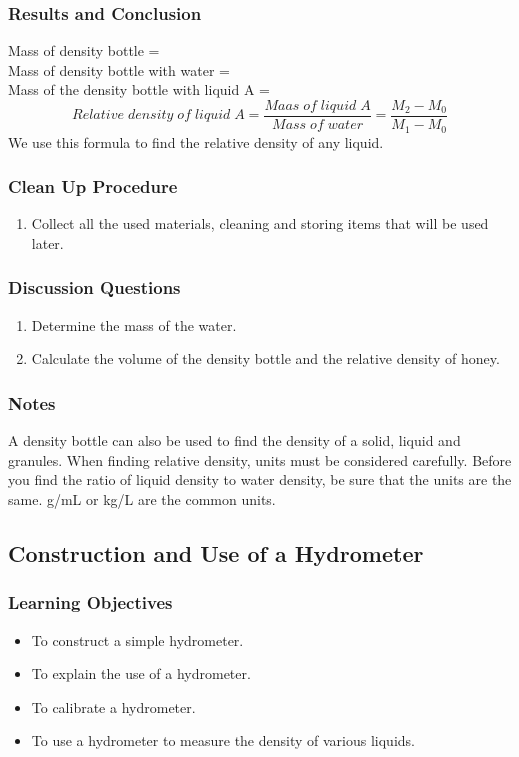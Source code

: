 \subsubsection*{Results and Conclusion}
Mass of density bottle = \\
Mass of density bottle with water = \\
Mass of the density bottle with liquid A = \\
$$Relative \;density \;of \;liquid \;A = \frac{Maas\; of\;liquid\;A}{Mass\; of\; water}=\frac{M_2-M_0}{M_1-M_0}$$
We use this formula to find the relative density of any liquid.

\subsubsection*{Clean Up Procedure}
\begin{enumerate}
\item{Collect all the used materials, cleaning and storing items that will be used later.} 
\end{enumerate}

\subsubsection*{Discussion Questions}
\begin{enumerate}
\item{Determine the mass of the water.} 
\item{Calculate the volume of the density bottle and the relative density of honey.} 
\end{enumerate}

\subsubsection*{Notes}
A density bottle can also be used to find the density of a solid, liquid and granules.
When finding relative density, units must be considered carefully.  Before you find the ratio of liquid density to water density, be sure that the units are the same.  g/mL or kg/L are the common units.

\subsection{Construction and Use of a Hydrometer}

\subsubsection*{Learning Objectives}
\begin{itemize}
\item{To construct a simple hydrometer.} 
\item{To explain the use of a hydrometer.} 
\item{To calibrate a hydrometer.} 
\item{To use a hydrometer to measure the density of various liquids.} 
\end{itemize}

